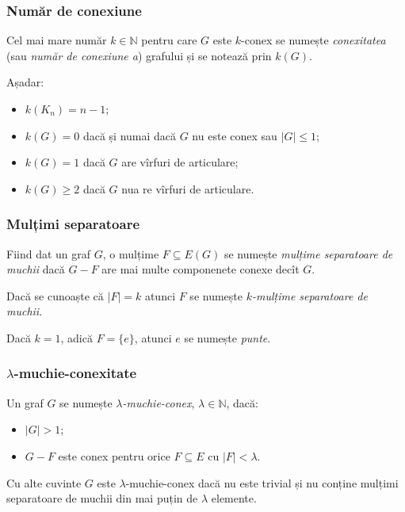 \begin{frame}
  \frametitle{Număr de conexiune}

Cel mai mare număr $k\in\mathbb{N}$ pentru care $G$ este $k$-conex se numește 
\emph{conexitatea} (sau \emph{număr de conexiune a}) grafului și se notează prin $k(G)$.\pause

Așadar: 
\begin{itemize}
  \item $k(K_n)=n-1$;\pause
  \item $k(G)=0$ dacă și numai dacă $G$ nu este conex sau $|G|\leq 1$;\pause
  \item $k(G)=1$ dacă $G$ are vîrfuri de articulare;\pause
  \item $k(G)\geq 2$ dacă $G$ nua re vîrfuri de articulare.
\end{itemize}

\end{frame}

\begin{frame}
  \frametitle{Mulțimi separatoare}

Fiind dat un graf $G$, o mulțime $F\subseteq E(G)$ se numește \emph{mulțime separatoare de muchii} dacă $G-F$ are mai multe componenete conexe decît $G$.\pause

Dacă se cunoaște că $|F|=k$ atunci $F$ se numește \emph{$k$-mulțime separatoare de muchii}.\pause

Dacă $k=1$, adică $F=\{e\}$, atunci $e$ se numește\pause{} \emph{punte}.

\end{frame}

\begin{frame}
  \frametitle{$\lambda$-muchie-conexitate}

Un graf $G$ se numește \emph{$\lambda$-muchie-conex}, $\lambda\in\mathbb{N}$, dacă:
\begin{itemize} 
 \item $|G|>1$;
 \item $G-F$ este conex pentru orice $F\subseteq E$ cu $|F|<\lambda$.
\end{itemize}\pause

Cu alte cuvinte $G$ este $\lambda$-muchie-conex dacă nu este trivial și nu conține mulțimi separatoare de muchii din mai puțin de $\lambda$ elemente.
 
\end{frame}

